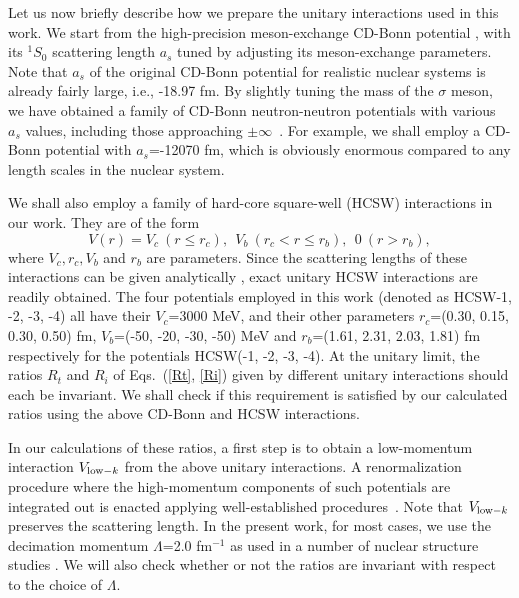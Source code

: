 \documentclass[twocolumn,preprintnumbers,superscriptaddress]{revtex4}
\begin{document}
Let us now briefly describe how we prepare
the unitary interactions used in this work.
We start from the high-precision meson-exchange CD-Bonn potential
\cite{CDBonn}, with its $^1S_0$ scattering length $a_s$
tuned by adjusting its  meson-exchange parameters.
Note that $a_s$ of the original
CD-Bonn potential for realistic nuclear systems is already
fairly large, i.e., -18.97 fm.
By slightly tuning the mass of the $\sigma$ meson, we have obtained
a family of CD-Bonn neutron-neutron potentials with various $a_s$ values,
including those approaching $\pm\infty$~\cite{Siu2008}.
For example, we shall employ  a CD-Bonn  potential with $a_s$=-12070 fm,
which is obviously enormous compared to any length
scales in the nuclear system.

We shall also employ a family of hard-core square-well (HCSW)
interactions in our work. They are of the form
\begin{equation}
V(r)=V_c~(r\le r_c),~~V_b~(r_c < r \le r_b),~~0~(r > r_b),
\end{equation}
where $V_c,r_c,V_b$ and $r_b$ are parameters.
Since the scattering lengths of these interactions can be given analytically \cite{Dong2010},
exact unitary HCSW interactions are readily obtained.
The four potentials employed in this work
(denoted as HCSW-1, -2, -3, -4) all have their $V_c$=3000 MeV,
and their other parameters  $r_c$=(0.30, 0.15, 0.30, 0.50) fm,
$V_b$=(-50, -20, -30, -50) MeV  and $r_b$=(1.61, 2.31, 2.03, 1.81) fm
respectively for the potentials HCSW(-1, -2, -3, -4).
At the unitary limit, the ratios $R_t$ and $R_i$ of Eqs.~(\ref{Rt}, \ref{Ri})
given by different
unitary interactions should each be invariant. We shall check
if this requirement is satisfied by our calculated ratios
using the above CD-Bonn and HCSW interactions.

In our calculations of these ratios, a first step is to obtain
a low-momentum interaction $V_{{\rm low}-k}$
from the above unitary interactions.
A renormalization procedure where the high-momentum
components of such potentials are integrated out is enacted
applying well-established procedures~\cite{Siu2008,vlowk1,vlowk2,vlowk3,vlowk4,vlowk5,vlowk6,vlowk7}.
Note that $V_{{\rm low}-k}$ preserves the scattering length.
In the present work, for most cases, we use the decimation momentum $\Lambda$=2.0 fm$^{-1}$
as used in a number of nuclear structure studies \cite{vlowk3}.
We will also check whether or not the ratios are invariant with respect to the choice of $\Lambda$.
\end{document}
